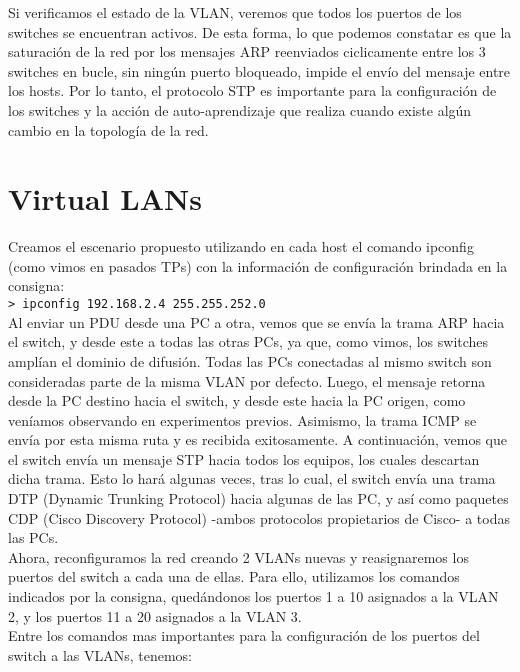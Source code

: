 \documentclass{article}
\begin{document}
Si verificamos el estado de la VLAN, veremos que todos los puertos de los switches se encuentran activos. De esta forma, lo que podemos constatar es que la saturación de la red por los mensajes ARP reenviados ciclicamente entre los 3 switches en bucle, sin ningún puerto bloqueado, impide el envío del mensaje entre los hosts. Por lo tanto, el protocolo STP es importante para la configuración de los switches y la acción de auto-aprendizaje que realiza cuando existe algún cambio en la topología de la red. \\

\section{Virtual LANs}

Creamos el escenario propuesto utilizando en cada host el comando ipconfig (como vimos en pasados TPs) con la información de configuración brindada en la consigna: \\

\texttt{> ipconfig 192.168.2.4 255.255.252.0} \\

Al enviar un PDU desde una PC a otra, vemos que se envía la trama ARP hacia el switch, y desde este a todas las otras PCs, ya que, como vimos, los switches amplían el dominio de difusión. Todas las PCs conectadas al mismo switch son consideradas parte de la misma VLAN por defecto. Luego, el mensaje retorna desde la PC destino hacia el switch, y desde este hacia la PC origen, como veníamos observando en experimentos previos. Asimismo, la trama ICMP se envía por esta misma ruta y es recibida exitosamente. A continuación, vemos que el switch envía un mensaje STP hacia todos los equipos, los cuales descartan dicha trama. Esto lo hará algunas veces, tras lo cual, el switch envía una trama DTP (Dynamic Trunking Protocol) hacia algunas de las PC, y así como paquetes CDP (Cisco Discovery Protocol) -ambos protocolos propietarios de Cisco- a todas las PCs. \\

Ahora, reconfiguramos la red creando 2 VLANs nuevas y reasignaremos los puertos del switch a cada una de ellas. Para ello, utilizamos los comandos indicados por la consigna, quedándonos los puertos 1 a 10 asignados a la VLAN 2, y los puertos 11 a 20 asignados a la VLAN 3. \\

Entre los comandos mas importantes para la configuración de los puertos del switch a las VLANs, tenemos: \\
\end{document}
